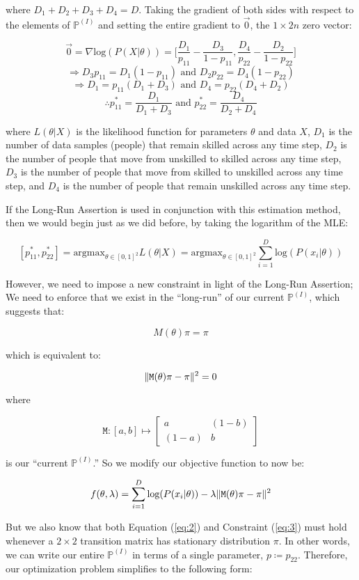 \documentclass{article}
\DeclarePairedDelimiter\norm{\lVert}{\rVert}
\begin{document}
where $D_1 + D_2 + D_3 + D_4 = D$. Taking the gradient of both sides with respect to the elements of $\mathbb{P}^{(I)}$ and setting the entire gradient to $\vec{0}$, the $1 \times 2n$ zero vector:

\[
\vec{0}
= \nabla \text{log}(P(X|\theta))
= \bigg[ \frac{D_1}{p_{11}} - \frac{D_3}{1-p_{11}}, \frac{D_4}{p_{22}} - \frac{D_2}{1-p_{22}} \bigg]
\]\[
\Rightarrow
D_3 p_{11} = D_1 (1-p_{11})
\text{ and }
D_2 p_{22} = D_4 (1-p_{22})
\]\[
\Rightarrow
D_1 = p_{11} (D_1 + D_3)
\text{ and }
D_4 = p_{22} (D_4 + D_2)
\]\[
\therefore
p_{11}^* = \frac{D_1}{D_1 + D_3}
\text{ and }
p_{22}^* = \frac{D_4}{D_2 + D_4}
\]

where $L(\theta|X)$ is the likelihood function for parameters $\theta$ and data $X$, $D_1$ is the number of data samples (people) that remain skilled across any time step, $D_2$ is the number of people that move from unskilled to skilled across any time step, $D_3$ is the number of people that move from skilled to unskilled across any time step, and $D_4$ is the number of people that remain unskilled across any time step.

If the Long-Run Assertion is used in conjunction with this estimation method, then we would begin just as we did before, by taking the logarithm of the MLE:

\[
[p_{11}^*, p_{22}^*]
= \text{argmax}_{\theta \in [0,1]^2} L(\theta|X)
= \text{argmax}_{\theta \in [0,1]^2} \sum^D_{i=1} \text{log}(P(x_i|\theta))
\]

However, we need to impose a new constraint in light of the Long-Run Assertion; We need to enforce that we exist in the ``long-run'' of our current $\mathbb{P}^{(I)}$, which suggests that:

\[
M(\theta)\pi = \pi
\]

which is equivalent to:

\[
\norm{ \texttt{M}(\theta)\pi - \pi }^2 = 0
\]

where

\[
\texttt{M}: [a, b] \mapsto \begin{bmatrix}
    a & (1-b) \\
    (1-a) & b
\end{bmatrix}
\]

is our ``current $\mathbb{P}^{(I)}$.'' So we modify our objective function to now be:

\[
f(\theta, \lambda) = \sum^D_{i=1} \text{log}(P(x_i|\theta)) - \lambda \norm{ \texttt{M}(\theta)\pi - \pi }^2
\]

But we also know that both Equation (\ref{eq:2}) and Constraint (\ref{eq:3}) must hold whenever a $2 \times 2$ transition matrix has stationary distribution $\pi$. In other words, we can write our entire $\mathbb{P}^{(I)}$ in terms of a single parameter, $p \coloneqq p_{22}$. Therefore, our optimization problem simplifies to the following form:
\end{document}
